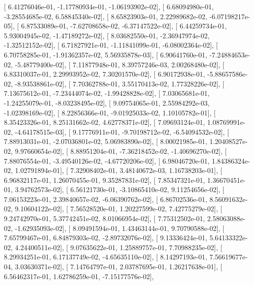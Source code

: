 \documentclass{article}
\begin{document}
       [  6.41276046e-01,  -1.17780934e-01,  -1.06193902e-02],
       [  6.68094980e-01,  -3.28554685e-02,   6.58845340e-02],
       [  8.65823903e-01,   2.22989682e-02,  -6.07198217e-05],
       [  6.87533089e-01,  -7.62708658e-02,  -6.37147522e-02],
       [  6.44259734e-01,   5.93004945e-02,  -1.47189272e-02],
       [  8.03682550e-01,  -2.36947974e-02,  -1.32512152e-02],
       [  6.71827921e-01,  -1.11841099e-01,  -6.08002364e-02],
       [  6.70758285e-01,  -1.91362357e-02,   5.56935878e-03],
       [  6.90641760e-01,  -7.24884653e-02,  -5.48779400e-02],
       [  7.11877948e-01,   8.39757246e-03,   2.00268480e-02],
       [  6.83310037e-01,   2.29993952e-02,   7.30201570e-02],
       [  6.90172938e-01,  -5.88657586e-02,  -8.93538861e-02],
       [  7.70362788e-01,   3.55170413e-02,   1.77328226e-02],
       [  7.13675612e-01,  -7.23444074e-02,  -1.99428828e-02],
       [  7.03065681e-01,  -1.24255079e-01,  -8.03238495e-02],
       [  9.09754065e-01,   2.55984292e-03,  -1.02398169e-02],
       [  8.22856366e-01,  -9.01925033e-02,   1.10105782e-01],
       [  8.35423326e-01,   8.25131662e-02,   4.62778371e-02],
       [  7.09693124e-01,   1.08769991e-02,  -4.64178515e-03],
       [  9.17776911e-01,  -9.70198712e-02,  -6.54094532e-02],
       [  7.88913031e-01,  -2.07036801e-02,   5.06983890e-02],
       [  8.00021985e-01,   1.20408527e-02,   9.97660654e-02],
       [  8.88951204e-01,  -7.36218452e-02,  -1.40696270e-02],
       [  7.88076554e-01,  -3.49540126e-02,  -4.67720206e-02],
       [  6.98046720e-01,   1.84386324e-02,   1.02791894e-01],
       [  7.32908402e-01,   3.48140672e-03,   1.16738203e-01],
       [  6.96832117e-01,   1.26070455e-01,   9.35287831e-02],
       [  7.85347321e-01,   1.36670451e-01,   3.94762573e-02],
       [  6.56121730e-01,  -3.10865410e-02,   9.11254656e-02],
       [  7.06153223e-01,   2.39840657e-02,  -6.06390762e-02],
       [  6.86702536e-01,   8.56091632e-02,   9.10604122e-02],
       [  7.56528520e-01,   1.20227599e-02,   7.42775279e-02],
       [  9.24742970e-01,   5.37742451e-02,   8.01066954e-02],
       [  7.75312502e-01,   2.58063088e-02,  -1.62935093e-02],
       [  8.09491594e-01,   1.43463144e-01,   9.70790588e-02],
       [  7.65799467e-01,   6.84879303e-02,  -2.89732076e-02],
       [  9.13336424e-01,   5.64133322e-02,   4.24400511e-02],
       [  9.07635622e-01,   1.25889757e-01,   7.70988235e-02],
       [  8.29934251e-01,   6.17137749e-02,  -4.65635110e-02],
       [  8.14297193e-01,   7.56619677e-04,   3.03630371e-02],
       [  7.14764797e-01,   2.03787695e-01,   1.26217638e-01],
       [  6.56462317e-01,   1.62786259e-01,  -7.15177576e-02],
\end{document}
